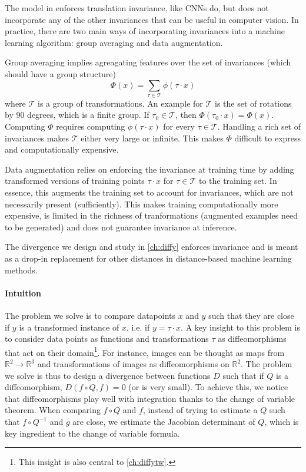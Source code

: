 The model in \cite{thiry} enforces translation invariance, like CNNs do, but does not incorporate any of the other invariances that can be useful in computer vision. In practice, there are two main ways of incorporating invariances into a machine learning algorithm: group averaging and data augmentation.

Group averaging implies agreagating features over the set of invariances (which should have a group structure)
\begin{equation}
    \Phi(x) = \sum_{\tau \in \mathcal T} \phi(\tau \cdot x)
\end{equation}
where $\mathcal T$ is a group of transformations. An example for $\mathcal T$ is the set of rotations by $90$ degrees, which is a finite group. If $\tau_0\in\mathcal T$, then $\Phi(\tau_0 \cdot x) = \Phi(x)$. Computing $\Phi$ requires computing $\phi(\tau \cdot x)$ for every $\tau\in\mathcal T$. Handling a rich set of invariances makes $\mathcal T$ either very large or infinite. This makes $\Phi$ difficult to express and computationally expensive.

Data augmentation relies on enforcing the invariance at training time by adding transformed versions of training points $\tau \cdot x$ for $\tau \in \mathcal T$ to the training set. In essence, this augments the training set to account for invariances, which are not necessarily present (sufficiently). This makes training computationally more expensive, is limited in the richness of tranformations (augmented examples need to be generated) and does not guarantee invariance at inference.

The divergence we design and study in \cref{ch:diffy} enforces invariance and is meant as a drop-in replacement for other distances in distance-based machine learning methods.

\paragraph{Intuition} The problem we solve is to compare datapoints $x$ and $y$ such that they are close if $y$ is a transformed instance of $x$, i.e. if $y = \tau \cdot x$. A key insight to this problem is to consider data points as functions and transformations $\tau$ as diffeomorphisms that act on their domain\footnote{This insight is also central to \cref{ch:diffytw}.}. For instance, images can be thought as maps from $\mathbb R^2 \to \mathbb R^3$ and transformations of images as diffeomorphisms on $\mathbb R^2$. The problem we solve is thus to design a divergence between functions $D$ such that if $Q$ is a diffeomorphism, $D(f\circ Q, f) = 0$ (or is very small). To achieve this, we notice that diffeomorphisms play well with integration thanks to the change of variable theorem. When comparing $f\circ Q$ and $f$, instead of trying to estimate a $Q$ such that $f\circ Q^{-1}$ and $g$ are close, we estimate the Jacobian determinant of $Q$, which is key ingredient to the change of variable formula.

